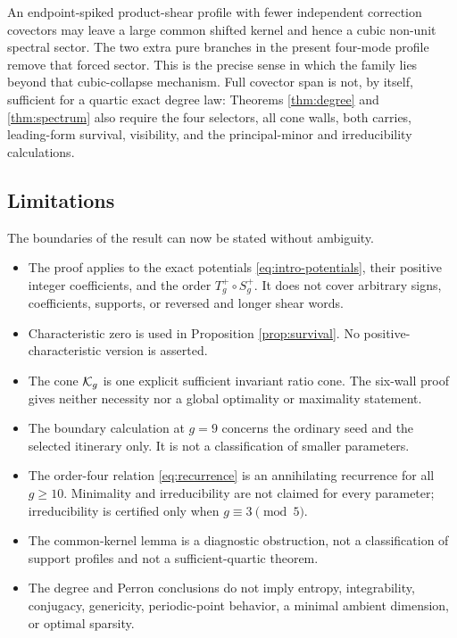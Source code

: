 \documentclass[11pt]{article}
\theoremstyle{remark}
\numberwithin{equation}{section}
\begin{document}
An endpoint-spiked product-shear profile with fewer independent correction
covectors may leave a large common shifted kernel and hence a cubic
non-unit spectral sector.  The two extra pure branches in the present
four-mode profile remove that forced sector.  This is the precise sense in
which the family lies beyond that cubic-collapse mechanism.  Full covector
span is not, by itself, sufficient for a quartic exact degree law:
Theorems \ref{thm:degree} and \ref{thm:spectrum} also require the four
selectors, all cone walls, both carries, leading-form survival, visibility,
and the principal-minor and irreducibility calculations.

\subsection{Limitations}

The boundaries of the result can now be stated without ambiguity.
\begin{itemize}
\item The proof applies to the exact potentials
\eqref{eq:intro-potentials}, their positive integer coefficients, and the
order \(T_g^+\circ S_g^+\).  It does not cover arbitrary signs,
coefficients, supports, or reversed and longer shear words.
\item Characteristic zero is used in Proposition \ref{prop:survival}.  No
positive-characteristic version is asserted.
\item The cone \(\mathcal{K}_g\) is one explicit sufficient invariant ratio cone.
The six-wall proof gives neither necessity nor a global optimality or
maximality statement.
\item The boundary calculation at \(g=9\) concerns the ordinary seed and
the selected itinerary only.  It is not a classification of smaller
parameters.
\item The order-four relation \eqref{eq:recurrence} is an annihilating
recurrence for all \(g\geq10\).  Minimality and irreducibility are not
claimed for every parameter; irreducibility is certified only when
\(g\equiv3\pmod5\).
\item The common-kernel lemma is a diagnostic obstruction, not a
classification of support profiles and not a sufficient-quartic theorem.
\item The degree and Perron conclusions do not imply entropy,
integrability, conjugacy, genericity, periodic-point behavior, a minimal
ambient dimension, or optimal sparsity.
\end{itemize}
\end{document}
